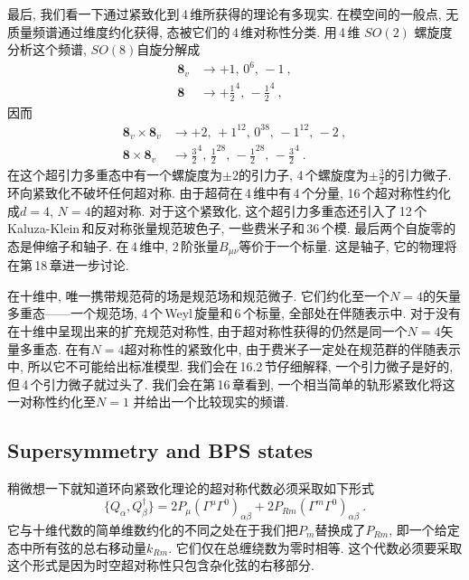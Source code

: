 最后, 我们看一下通过紧致化到\,4\,维所获得的理论有多现实. 在模空间的一般点, 无质量频谱通过维度约化获得, 态被它们的\,4\,维对称性分类. 用\,4\,维 $SO(2)$ 螺旋度分析这个频谱, $SO(8) $自旋分解成
\begin{subequations}
    \begin{align}
        \mathbf{8}_{v} &\to +1,\,0^{6},\,-1\:, \label{11.6.21a}  \\
        \mathbf{8} &\to +\tfrac{1}{2}^{4},\,-\tfrac{1}{2}^{4} \:, \label{11.6.21b}
    \end{align}
\end{subequations}  
因而
\begin{subequations}
    \begin{align}
        \mathbf{8}_{v}\times\mathbf{8}_{v} &\to +2,\,+1^{12},\,0^{38},\,-1^{12},\,-2\:, \label{11.6.22a} \\
        \mathbf{8}\times \mathbf{8}_{v} &\to \tfrac{3}{2}^{4},\,\tfrac{1}{2}^{28},\,-\tfrac{1}{2}^{28},\,-\tfrac{3}{2}^{4} \:. \label{11.6.22b}
    \end{align}
\end{subequations}
在这个超引力多重态中有一个螺旋度为$ \pm2 $的引力子, 4\,个螺旋度为$ \pm\frac{3}{2} $的引力微子. 环向紧致化不破坏任何超对称. 由于超荷在\,4\,维中有\,4\,个分量, 16\,个超对称性约化成$ d=4$, $N=4 $的超对称. 对于这个紧致化, 这个超引力多重态还引入了\,12\,个\,Kaluza-Klein\,和反对称张量规范玻色子, 一些费米子和\,36\,个模. 最后两个自旋零的态是伸缩子和轴子. 在\,4\,维中, 2\,阶张量$ B_{\mu\nu} $等价于一个标量. 这是轴子, 它的物理将在第\,18\,章进一步讨论.

在十维中, 唯一携带规范荷的场是规范场和规范微子. 它们约化至一个$ N=4 $的矢量多重态------一个规范场, 4\,个\,Weyl\,旋量和\,6\,个标量, 全部处在伴随表示中. 对于没有在十维中呈现出来的扩充规范对称性, 由于超对称性获得的仍然是同一个$ N=4 $矢量多重态. 在有$ N=4 $超对称性的紧致化中, 由于费米子一定处在规范群的伴随表示中, 所以它不可能给出标准模型. 我们会在\,16.2\,节仔细解释, 一个引力微子是好的, 但\,4\,个引力微子就过头了. 我们会在第\,16\,章看到, 一个相当简单的轨形紧致化将这一对称性约化至$ N=1$ 并给出一个比较现实的频谱.

\subsection*{Supersymmetry and BPS states}

稍微想一下就知道环向紧致化理论的超对称代数必须采取如下形式
\begin{equation}
    \{Q_{\alpha},Q^{\dag}_{\beta}\} = 2P_{\mu}(\Gamma^{\mu}\Gamma^{0})_{\alpha\beta} +2P_{Rm}(\Gamma^{m}\Gamma^{0})_{\alpha\beta} \:. \label{11.6.23}
\end{equation}
它与十维代数的简单维数约化的不同之处在于我们把$ P_{m} $替换成了$ P_{Rm}$, 即一个给定态中所有弦的总右移动量$ k_{Rm}$. 它们仅在总缠绕数为零时相等. 这个代数必须要采取这个形式是因为时空超对称性只包含杂化弦的右移部分.

